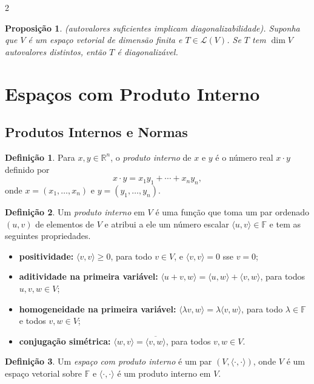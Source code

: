 \documentclass{article}
\theoremstyle{plain}
\newtheorem{prop}[thm]{Proposição}
\theoremstyle{definition}
\newtheorem{defn}{Definição}[section]
\theoremstyle{remark}
\begin{document}
\begin{multicols}{2}
\begin{prop} (autovalores suficientes implicam diagonalizabilidade).
    Suponha que \(V\) é um espaço vetorial de dimensão finita e \(T \in \mathcal{L}(V)\). Se \(T\) tem \(\dim V\) autovalores distintos, então \(T\) é diagonalizável.
\end{prop}

\section{Espaços com Produto Interno}
\subsection{Produtos Internos e Normas}

\begin{defn}
    Para \(x, y \in \mathbb{R}^n\), o \emph{produto interno} de \(x\) e \(y\) é o número real \(x \cdot y\) definido por
    \[
        x \cdot y = x_1 y_1 + \cdots + x_n y_n,
    \]
    \noindent onde \(x = (x_1, \ldots, x_n)\) e \(y = (y_1, \ldots, y_n)\).
\end{defn}

\begin{defn}
    Um \emph{produto interno} em \(V\) é uma função que toma um par ordenado \((u, v)\) de elementos de \(V\) e atribui a ele um número escalar \(\langle u, v \rangle \in \mathbb{F}\) e tem as seguintes propriedades.
    \begin{itemize}
        \item \textbf{positividade:} \(\langle v, v \rangle \geq 0\), para todo \(v \in V\), e \(\langle v, v \rangle = 0\) sse \(v = 0\);
        \item \textbf{aditividade na primeira variável:} \(\langle u + v, w \rangle = \langle u, w \rangle + \langle v, w \rangle\), para todos \(u, v, w \in V\);
        \item \textbf{homogeneidade na primeira variável:} \(\langle \lambda v, w \rangle = \lambda \langle v, w \rangle\), para todo \(\lambda \in \mathbb{F}\) e todos \(v, w \in V\);
        \item \textbf{conjugação simétrica:} \(\langle w, v \rangle = \overline{\langle v, w \rangle}\), para todos \(v, w \in V\).
    \end{itemize}
\end{defn}

\begin{defn}
    Um \emph{espaço com produto interno} é um par \((V, \langle \cdot, \cdot \rangle)\), onde \(V\) é um espaço vetorial sobre \(\mathbb{F}\) e \(\langle \cdot, \cdot \rangle\) é um produto interno em \(V\).
\end{defn}


\end{multicols}
\end{document}
